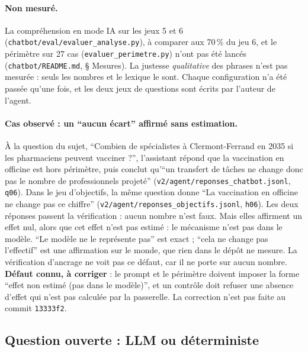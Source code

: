 \paragraph{Non mesuré.}
La compréhension en mode IA sur les jeux 5 et 6 (\texttt{chatbot/\allowbreak{}eval/\allowbreak{}evaluer\_\allowbreak{}analyse.py}), à comparer aux 70\,\%\mesure{} du jeu 6, et le périmètre sur 27\mesure{} cas (\texttt{evaluer\_\allowbreak{}perimetre.py}) n'ont pas été lancés (\texttt{chatbot/\allowbreak{}README.md}, § Mesures).
La justesse \emph{qualitative} des phrases n'est pas mesurée : seuls les nombres et le lexique le sont.
Chaque configuration n'a été passée qu'une fois, et les deux jeux de questions sont écrits par l'auteur de l'agent.

\paragraph{Cas observé : un \enquote{aucun écart} affirmé sans estimation.}\label{pro:cas-ecart}
À la question du sujet, \enquote{Combien de spécialistes à Clermont-Ferrand en 2035 si les pharmaciens peuvent vacciner ?}, l'assistant répond que la vaccination en officine est hors périmètre, puis conclut qu'\enquote{un transfert de tâches ne change donc pas le nombre de professionnels projeté} (\texttt{v2/\allowbreak{}agent/\allowbreak{}reponses\_\allowbreak{}chatbot.jsonl}, \texttt{q06}).
Dans le jeu d'objectifs, la même question donne \enquote{La vaccination en officine ne change pas ce chiffre} (\texttt{v2/\allowbreak{}agent/\allowbreak{}reponses\_\allowbreak{}objectifs.jsonl}, \texttt{h06}).
Les deux réponses passent la vérification : aucun nombre n'est faux.
Mais elles affirment un effet nul, alors que cet effet n'est pas estimé : le mécanisme n'est pas dans le modèle.
\enquote{Le modèle ne le représente pas} est exact ; \enquote{cela ne change pas l'effectif} est une affirmation sur le monde, que rien dans le dépôt ne mesure.
La vérification d'ancrage ne voit pas ce défaut, car il ne porte sur aucun nombre.
\textbf{Défaut connu, à corriger} : le prompt et le périmètre doivent imposer la forme \enquote{effet non estimé (pas dans le modèle)}, et un contrôle doit refuser une absence d'effet qui n'est pas calculée par la passerelle. La correction n'est pas faite au commit \texttt{13333f2}.

\subsection{Question ouverte : LLM ou déterministe}\label{pro:llm-det}

